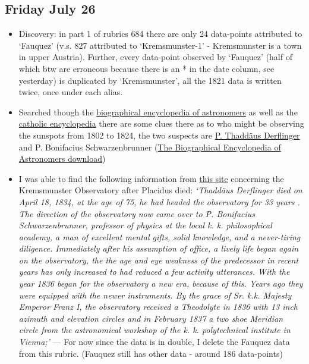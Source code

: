 \documentclass[12pt]{article}
\begin{document}
\subsection{Friday July 26}
\begin{itemize}
    \begin{itemize}
        \begin{itemize}
            \item Discovery: in part 1 of rubrics 684 there are only 24 data-points attributed to `Fauquez' (v.s. 827 attributed to `Kremsmunster-1' - Kremsmunster is a town in upper Austria). Further, every data-point observed by `Fauquez' (half of which btw are erroneous because there is an * in the date column, see yesterday) is duplicated by `Kremsmunster', all the 1821 data is written twice, once under each alias.
            \item Searched though the \href{https://link.springer.com/referencework/10.1007/978-0-387-30400-7}{biographical encyclopedia of astronomers} as well as the \href{http://libgen.io/search.php?req=Catholic+Encyclopedia&lg_topic=libgen&open=0&view=simple&res=25&phrase=1&column=def}{catholic encyclopedia} there are some clues there as to who might be observing the sunspots from 1802 to 1824, the two suspects are \href{http://www.specula.at/adv/derfling.htm}{P. Thaddäus Derflinger} and P. Bonifacius Schwarzenbrunner (\href{http://booksdescr.org/item/index.php?md5=B794C8ED51AC97D042F20C39D54BB87F}{The Biographical Encyclopedia of Astronomers download}) 
            \item I was able to find the following information from \href{https://digi.landesbibliothek.at/viewer/fulltext/AC08094596/5/}{this site} concerning the Kremsmunster Observatory after Placidus died: \textit{`Thaddäus Derflinger died on April 18, 1834, at the age of 75, he had headed the observatory for 33 years . The direction of the observatory now came over to P. Bonifacius Schwarzenbrunner, professor of physics at the local k. k. philosophical academy, a man of excellent mental gifts, solid knowledge, and a never-tiring diligence. Immediately after his assumption of office, a lively life began again on the observatory, the the age and eye weakness of the predecessor in recent years has only increased to had reduced a few activity utterances. With the year 1836 began for the observatory a new era, because of this. Years ago they were equipped with the newer instruments. By the grace of Sr. k.k. Majesty Emperor Franz I, the observatory received a Theodolyte in 1836 with 13 inch azimuth and elevation circles and in February 1837 a two shoe Meridian circle from the astronomical workshop of the k. k. polytechnical institute in Vienna;'} --- For now since the data is in double, I delete the Fauquez data from this rubric. (Fauquez still has other data - around 186 data-points)

\end{itemize}
\end{itemize}
\end{itemize}
\end{document}
